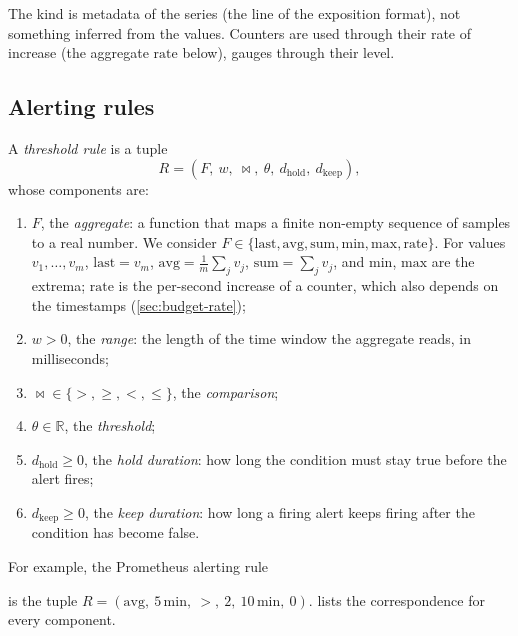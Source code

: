 The kind is metadata of the series (the  line of the exposition
format), not something inferred from the values. Counters are used through
their rate of increase (the aggregate $\mathrm{rate}$ below), gauges
through their level.

\subsection{Alerting rules}

\begin{definition}
\label{def:rule}
A \emph{threshold rule} is a tuple
\[
  R = (F,\ w,\ \bowtie,\ \theta,\ d_{\mathrm{hold}},\ d_{\mathrm{keep}}),
\]
whose components are:
\begin{enumerate}
  \item $F$, the \emph{aggregate}: a function that maps a finite non-empty
    sequence of samples to a real number. We consider
    $F \in \{\mathrm{last}, \mathrm{avg}, \mathrm{sum}, \mathrm{min},
    \mathrm{max}, \mathrm{rate}\}$. For values $v_1, \dots, v_m$,
    $\mathrm{last} = v_m$, $\mathrm{avg} = \frac1m \sum_j v_j$,
    $\mathrm{sum} = \sum_j v_j$, and $\mathrm{min}$, $\mathrm{max}$ are the
    extrema; $\mathrm{rate}$ is the per-second increase of a counter, which
    also depends on the timestamps (\cref{sec:budget-rate});
  \item $w > 0$, the \emph{range}: the length of the time window the
    aggregate reads, in milliseconds;
  \item ${\bowtie} \in \{>, \ge, <, \le\}$, the \emph{comparison};
  \item $\theta \in \mathbb{R}$, the \emph{threshold};
  \item $d_{\mathrm{hold}} \ge 0$, the \emph{hold duration}: how long the
    condition must stay true before the alert fires;
  \item $d_{\mathrm{keep}} \ge 0$, the \emph{keep duration}: how long a
    firing alert keeps firing after the condition has become false.
\end{enumerate}
\end{definition}

For example, the Prometheus alerting rule
\begin{center}
\qquad {}
\end{center}
is the tuple $R = (\mathrm{avg},\ 5\,\mathrm{min},\ {>},\ 2,\
10\,\mathrm{min},\ 0)$.  lists the correspondence for
every component.

